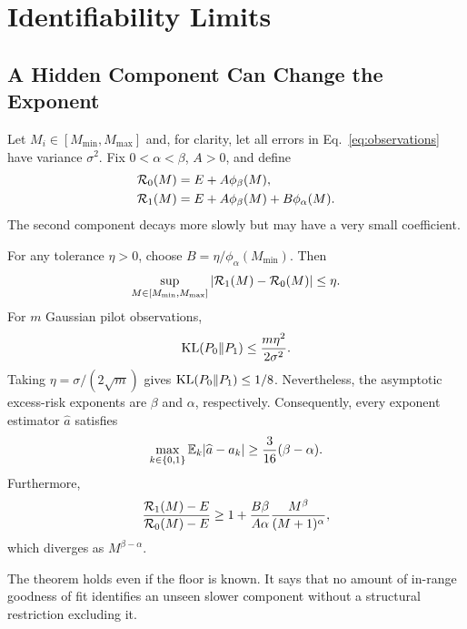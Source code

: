 \section{Identifiability Limits}

\subsection{A Hidden Component Can Change the Exponent}

Let $M_i\in[M_{\min},M_{\max}]$ and, for clarity, let all errors in Eq.~\eqref{eq:observations} have variance $\sigma^2$. Fix $0<\alpha<\beta$, $A>0$, and define
\begin{align}
 \mathcal{R}_0(M)&=E+A\phi_\beta(M),\\
 \mathcal{R}_1(M)&=E+A\phi_\beta(M)+B\phi_\alpha(M).
 \label{eq:hidden-pair}
\end{align}
The second component decays more slowly but may have a very small coefficient.

\begin{theorem}
\label{thm:hidden}
For any tolerance $\eta>0$, choose
$B=\eta/\phi_\alpha(M_{\min})$. Then
\begin{equation}
 \sup_{M\in[M_{\min},M_{\max}]}
 |\mathcal{R}_1(M)-\mathcal{R}_0(M)|\le\eta.
 \label{eq:pilot-close}
\end{equation}
For $m$ Gaussian pilot observations,
\begin{equation}
 \mathrm{KL}(P_0\|P_1)\le\frac{m\eta^2}{2\sigma^2}.
 \label{eq:hidden-kl}
\end{equation}
Taking $\eta=\sigma/(2\sqrt m)$ gives $\mathrm{KL}(P_0\|P_1)\le1/8$. Nevertheless, the asymptotic excess-risk exponents are $\beta$ and $\alpha$, respectively. Consequently, every exponent estimator $\widehat a$ satisfies
\begin{equation}
 \max_{k\in\{0,1\}}\mathbb{E}_k|\widehat a-a_k|
 \ge \frac{3}{16}(\beta-\alpha).
 \label{eq:exponent-lower}
\end{equation}
Furthermore,
\begin{equation}
 \frac{\mathcal{R}_1(M)-E}{\mathcal{R}_0(M)-E}
 \ge 1+\frac{B\beta}{A\alpha}\frac{M^\beta}{(M+1)^\alpha},
 \label{eq:relative-divergence}
\end{equation}
which diverges as $M^{\beta-\alpha}$.
\end{theorem}

The theorem holds even if the floor is known. It says that no amount of in-range goodness of fit identifies an unseen slower component without a structural restriction excluding it.

